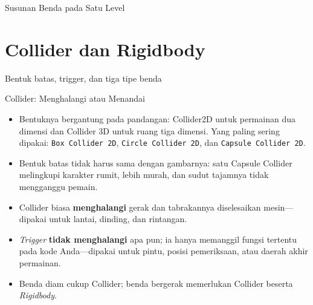 \documentclass[aspectratio=169,10pt]{beamer}
\begin{document}
\begin{frame}{Susunan Benda pada Satu Level}
\centering
{}
\end{frame}

\section{Collider dan Rigidbody}
  {Bentuk batas, trigger, dan tiga tipe benda}

\begin{frame}{Collider: Menghalangi atau Menandai}
\begin{itemize}
  \item Bentuknya bergantung pada pandangan: Collider2D untuk permainan dua
        dimensi dan Collider 3D untuk ruang tiga dimensi. Yang paling sering
        dipakai: \texttt{Box Collider 2D}, \texttt{Circle Collider 2D}, dan
        \texttt{Capsule Collider 2D}.
  \item Bentuk batas tidak harus sama dengan gambarnya: satu Capsule Collider
        melingkupi karakter rumit, lebih murah, dan sudut tajamnya tidak
        mengganggu pemain.
  \item Collider biasa \textbf{menghalangi} gerak dan tabrakannya diselesaikan
        mesin---dipakai untuk lantai, dinding, dan rintangan.
  \item \emph{Trigger} \textbf{tidak menghalangi} apa pun; ia hanya memanggil
        fungsi tertentu pada kode Anda---dipakai untuk pintu, posisi
        pemeriksaan, atau daerah akhir permainan.
  \item Benda diam cukup Collider; benda bergerak memerlukan Collider beserta
        \emph{Rigidbody}.
\end{itemize}
\end{frame}
\end{document}
